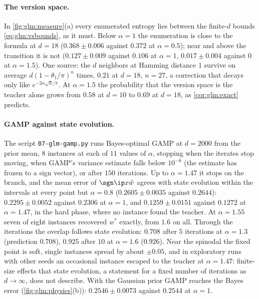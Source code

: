 \begin{refsection}
\paragraph{The version space.} In \cref{fig:glm:measure}(a) every enumerated entropy lies between the finite-$d$ bounds \eqref{eq:glm:vsbounds}, as it must. Below $\alpha=1$ the enumeration is close to the formula at $d=18$ ($0.368\pm0.006$ against $0.372$ at $\alpha=0.5$); near and above the transition it is not ($0.127\pm0.009$ against $0.106$ at $\alpha=1$, $0.017\pm0.004$ against $0$ at $\alpha=1.5$). One source: the $d$ neighbors at Hamming distance $1$ survive on average $d(1-\theta_1/\pi)^n$ times, $0.21$ at $d=18$, $n=27$, a correction that decays only like $e^{-2\alpha\sqrt d/\pi}$. At $\alpha=1.5$ the probability that the version space is the teacher alone grows from $0.58$ at $d=10$ to $0.69$ at $d=18$, as \cref{cor:glm:exact} predicts.

\paragraph{GAMP against state evolution.} The script \texttt{07-glm-gamp.py} runs Bayes-optimal GAMP at $d=2000$ from the prior mean, $8$ instances at each of $11$ values of $\alpha$, stopping when the iterates stop moving, when GAMP's variance estimate falls below $10^{-8}$ (the estimate has frozen to a sign vector), or after $150$ iterations. Up to $\alpha=1.47$ it stops on the branch, and the mean error of $\sgn\ip x{\hat w}$ agrees with state evolution within the intervals at every point but $\alpha=0.8$ ($0.2605\pm0.0035$ against $0.2644$): $0.2295\pm0.0052$ against $0.2306$ at $\alpha=1$, and $0.1259\pm0.0151$ against $0.1272$ at $\alpha=1.47$, in the hard phase, where no instance found the teacher. At $\alpha=1.55$ seven of eight instances recovered $w^*$ exactly, from $1.6$ on all. Through the iterations the overlap follows state evolution: $0.708$ after $5$ iterations at $\alpha=1.3$ (prediction $0.708$), $0.925$ after $10$ at $\alpha=1.6$ ($0.926$). Near the spinodal the fixed point is soft, single instances spread by about $\pm0.05$, and in exploratory runs with other seeds an occasional instance escaped to the teacher at $\alpha=1.47$: finite-size effects that state evolution, a statement for a fixed number of iterations as $d\to\infty$, does not describe. With the Gaussian prior GAMP reaches the Bayes error (\cref{fig:glm:physics}(b)): $0.2546\pm0.0073$ against $0.2544$ at $\alpha=1$.


\end{refsection}
